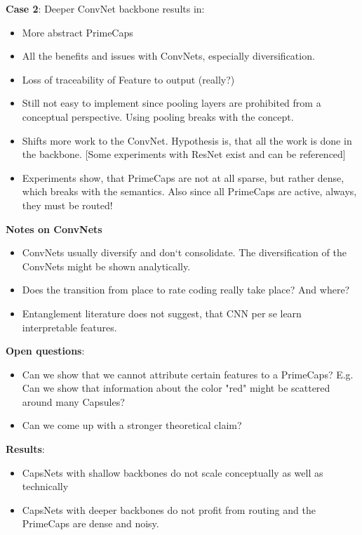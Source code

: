 \documentclass{article}
\begin{document}
\textbf{Case 2}: Deeper ConvNet backbone results in:
\begin{itemize}
	\item More abstract PrimeCaps
	\item All the benefits and issues with ConvNets, especially diversification.
	\item Loss of traceability of Feature to output (really?)
	\item Still not easy to implement since pooling layers are prohibited from a conceptual perspective. Using pooling breaks with the concept.
	\item Shifts more work to the ConvNet. Hypothesis is, that all the work is done in the backbone. [Some experiments with ResNet exist and can be referenced]
	\item Experiments show, that PrimeCaps are not at all sparse, but rather dense, which breaks with the semantics. Also since all PrimeCaps are active, always, they must be routed!
\end{itemize}

\textbf{Notes on ConvNets}
\begin{itemize}
	\item ConvNets usually diversify and don`t consolidate. The diversification of the ConvNets might be shown analytically.
	\item Does the transition from place to rate coding really take place? And where?
	\item Entanglement literature does not suggest, that CNN per se learn interpretable features.
\end{itemize}

\textbf{Open questions}:
\begin{itemize}
	\item Can we show that we cannot attribute certain features to a PrimeCaps? E.g. Can we show that information about the color "red" might be scattered around many Capsules?
	\item Can we come up with a stronger theoretical claim?
\end{itemize}

\textbf{Results}:
\begin{itemize}
	\item CapsNets with shallow backbones do not scale conceptually as well as technically
	\item CapsNets with deeper backbones do not profit from routing and the PrimeCaps are dense and noisy. 
\end{itemize}
\end{document}
